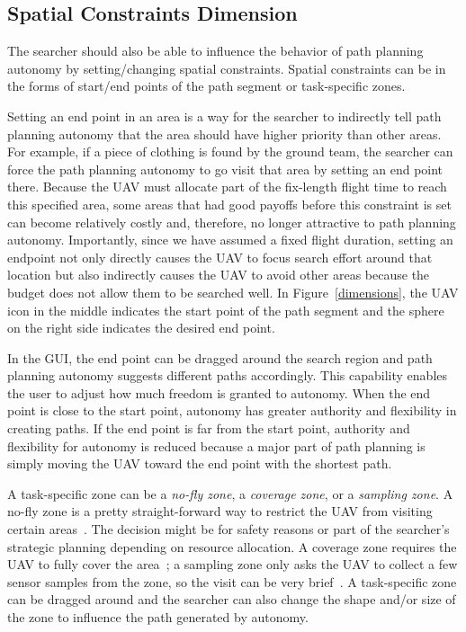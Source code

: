 \subsection{Spatial Constraints Dimension}

The searcher should also be able to influence the behavior of path planning autonomy by setting/changing spatial constraints. Spatial constraints can be in the forms of start/end points of the path segment or task-specific zones.

Setting an end point in an area is a way for the searcher to indirectly tell path planning autonomy that the area should have higher priority than other areas. For example, if a piece of clothing is found by the ground team, the searcher can force the path planning autonomy to go visit that area by setting an end point there. Because the UAV must allocate part of the fix-length flight time to reach this specified area, some areas that had good payoffs before this constraint is set can become relatively costly and, therefore, no longer attractive to path planning autonomy. Importantly, since we have assumed a fixed flight duration, setting an endpoint not only directly causes the UAV to focus search effort around that location but also indirectly causes the UAV to avoid other areas because the budget does not allow them to be searched well. In Figure~\ref{dimensions}, the UAV icon in the middle indicates the start point of the path segment and the sphere on the right side indicates the desired end point. 

In the GUI, the end point can be dragged around the search region and path planning autonomy suggests different paths accordingly. This capability enables the user to adjust how much freedom is granted to autonomy. When the end point is close to the start point, autonomy has greater authority and flexibility in creating paths. If the end point is far from the start point, authority and flexibility for autonomy is reduced because a major part of path planning is simply moving the UAV toward the end point with the shortest path.

A task-specific zone can be a \textit{no-fly zone}, a \textit{coverage zone}, or a \textit{sampling zone}. A no-fly zone is a pretty straight-forward way to restrict the UAV from visiting certain areas~\cite{Clark2013Hierarchical,Jorris2009Three}. The decision might be for safety reasons or part of the searcher's strategic planning depending on resource allocation. A coverage zone requires the UAV to fully cover the area~\cite{Lin2009UAV}; a sampling zone only asks the UAV to collect a few sensor samples from the zone, so the visit can be very brief~\cite{Clark2013Hierarchical}. A task-specific zone can be dragged around and the searcher can also change the shape and/or size of the zone to influence the path generated by autonomy.

